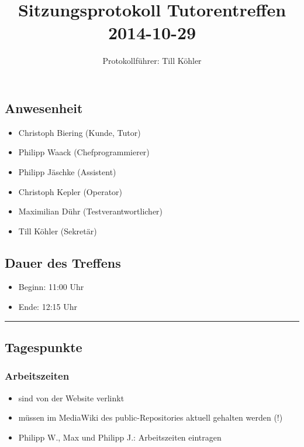 \documentclass[12pt,a4paper]{article}
\author{Protokollführer: Till Köhler}
\title{Sitzungsprotokoll Tutorentreffen 2014-10-29}
\date{}
\begin{document}
\maketitle

\subsection*{Anwesenheit}
\medskip
\begin{itemize}
\item Christoph Biering (Kunde, Tutor)
\item Philipp Waack (Chefprogrammierer)
\item Philipp Jäschke (Assistent)
\item Christoph Kepler (Operator)
\item Maximilian Dühr (Testverantwortlicher)
\item Till Köhler (Sekretär)
\end{itemize}

\subsection*{Dauer des Treffens}
\medskip
\begin{itemize}
\item Beginn: 11:00 Uhr
\item Ende: 12:15 Uhr
\end{itemize}

\noindent\rule{\textwidth}{1pt}

\subsection*{Tagespunkte}
\medskip

\subsubsection*{Arbeitszeiten}
\begin{itemize}
\item sind von der Website verlinkt
\item müssen im MediaWiki des public-Repositories aktuell gehalten werden (!)
\item Philipp W., Max und Philipp J.: Arbeitszeiten eintragen
\end{itemize}
\end{document}
